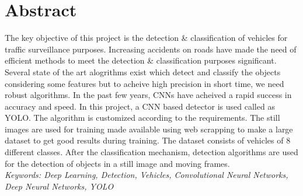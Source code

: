 
\chapter*{Abstract}
\vspace{-3mm}
The key objective of this project is the detection \& classification of vehicles for traffic surveillance purposes.
Increasing accidents on roads have made the need of efficient methods to meet the detection \& classification
purposes significant. Several state of the art alogrithms exist which detect and classify the objects considering
some features but to acheive high precision in short time, we need robust algorithms. In the past few years, CNNs have
acheived a rapid success in accuracy and speed. In this project, a CNN based detector is used called as YOLO. The algorithm is
customized according to the requirements. The still images are used for training made available using web scrapping to make a large dataset
to get good results during training. The dataset consists of vehicles of 8 different classes. After the classification 
mechanism, detection algorithms are used for the detection of objects in a still image 
and moving frames. 
\vspace{15mm}\ \\
\textit{Keywords: Deep Learning, Detection, Vehicles, Convolutional Neural Networks, Deep Neural Networks, YOLO}
